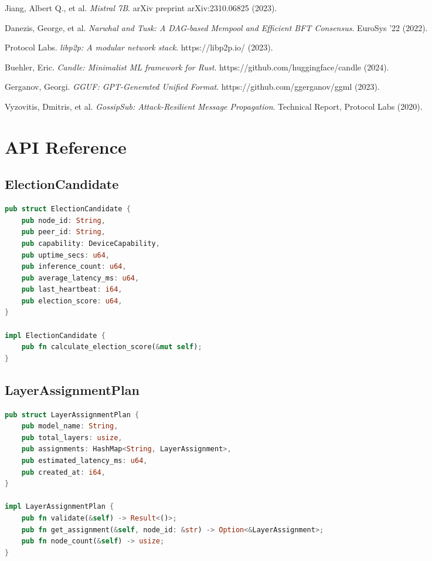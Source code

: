 \documentclass[12pt,a4paper]{article}
\begin{document}
\begin{thebibliography}{9}

Jiang, Albert Q., et al.
\textit{Mistral 7B}.
arXiv preprint arXiv:2310.06825 (2023).

Danezis, George, et al.
\textit{Narwhal and Tusk: A DAG-based Mempool and Efficient BFT Consensus}.
EuroSys '22 (2022).

Protocol Labs.
\textit{libp2p: A modular network stack}.
https://libp2p.io/ (2023).

Buehler, Eric.
\textit{Candle: Minimalist ML framework for Rust}.
https://github.com/huggingface/candle (2024).

Gerganov, Georgi.
\textit{GGUF: GPT-Generated Unified Format}.
https://github.com/ggerganov/ggml (2023).

Vyzovitis, Dmitris, et al.
\textit{GossipSub: Attack-Resilient Message Propagation}.
Technical Report, Protocol Labs (2020).

\end{thebibliography}

\appendix

\section{API Reference}

\subsection{ElectionCandidate}
\begin{lstlisting}[language=Rust]
pub struct ElectionCandidate {
    pub node_id: String,
    pub peer_id: String,
    pub capability: DeviceCapability,
    pub uptime_secs: u64,
    pub inference_count: u64,
    pub average_latency_ms: u64,
    pub last_heartbeat: i64,
    pub election_score: u64,
}

impl ElectionCandidate {
    pub fn calculate_election_score(&mut self);
}
\end{lstlisting}

\subsection{LayerAssignmentPlan}
\begin{lstlisting}[language=Rust]
pub struct LayerAssignmentPlan {
    pub model_name: String,
    pub total_layers: usize,
    pub assignments: HashMap<String, LayerAssignment>,
    pub estimated_latency_ms: u64,
    pub created_at: i64,
}

impl LayerAssignmentPlan {
    pub fn validate(&self) -> Result<()>;
    pub fn get_assignment(&self, node_id: &str) -> Option<&LayerAssignment>;
    pub fn node_count(&self) -> usize;
}
\end{lstlisting}
\end{document}
